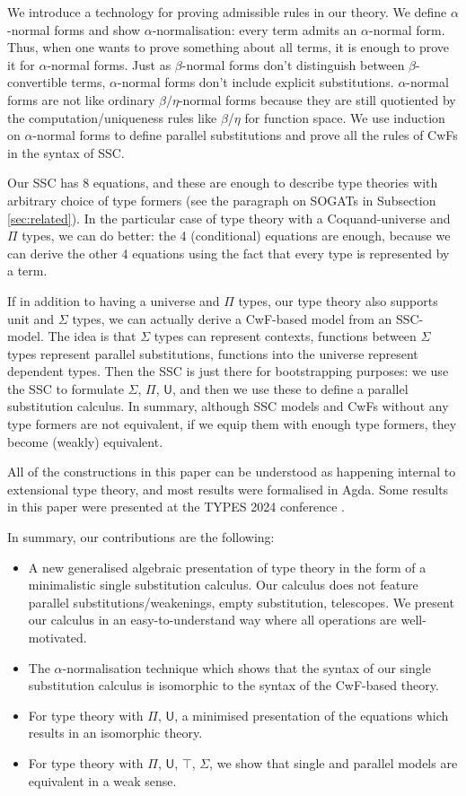\documentclass[a4paper,UKenglish,cleveref, autoref, thm-restate]{lipics-v2021}
\newcommand{\U}{\mathsf{U}}
\begin{document}
We introduce a technology for proving admissible rules in our
theory. We define $\alpha$-normal forms and show
$\alpha$-normalisation: every term admits an $\alpha$-normal form.
Thus, when one wants to prove something about all terms, it is enough
to prove it for $\alpha$-normal forms. Just as $\beta$-normal forms
don't distinguish between $\beta$-convertible terms, $\alpha$-normal
forms don't include explicit substitutions. $\alpha$-normal forms are
not like ordinary $\beta/\eta$-normal forms because they are still
quotiented by the computation/uniqueness rules like $\beta$/$\eta$ for
function space. We use induction on $\alpha$-normal forms to define
parallel substitutions and prove all the rules of CwFs in the syntax
of SSC.

Our SSC has 8 equations, and these are enough to describe type
theories with arbitrary choice of type formers (see the paragraph on
SOGATs in Subsection \ref{sec:related}). In the particular case of
type theory with a Coquand-universe and $\Pi$ types, we can do better:
the 4 (conditional) equations are enough, because we can derive the
other 4 equations using the fact that every type is represented by a
term.

If in addition to having a universe and $\Pi$ types, our type theory
also supports unit and $\Sigma$ types, we can actually derive a
CwF-based model from an SSC-model. The idea is that $\Sigma$ types can
represent contexts, functions between $\Sigma$ types represent
parallel substitutions, functions into the universe represent
dependent types. Then the SSC is just there for bootstrapping
purposes: we use the SSC to formulate $\Sigma$, $\Pi$, $\U$, and then
we use these to define a parallel substitution calculus. In summary,
although SSC models and CwFs without any type formers are not
equivalent, if we equip them with enough type formers, they become
(weakly) equivalent.

All of the constructions in this paper can be understood as happening
internal to extensional type theory, and most results were formalised
in Agda. Some results in this paper were presented at the TYPES 2024
conference \cite{singleTypes}.

In summary, our contributions are the following:
\begin{itemize}
\item A new generalised algebraic presentation of type theory in the
  form of a minimalistic single substitution calculus. Our calculus
  does not feature parallel substitutions/weakenings, empty
  substitution, telescopes. We present our calculus in an
  easy-to-understand way where all operations are well-motivated.
\item The $\alpha$-normalisation technique which shows that the syntax
  of our single substitution calculus is isomorphic to the syntax of
  the CwF-based theory.
\item For type theory with $\Pi$, $\U$, a minimised presentation of
  the equations which results in an isomorphic theory.
\item For type theory with $\Pi$, $\U$, $\top$, $\Sigma$, we show that
  single and parallel models are equivalent in a weak sense.
\end{itemize}
\end{document}
